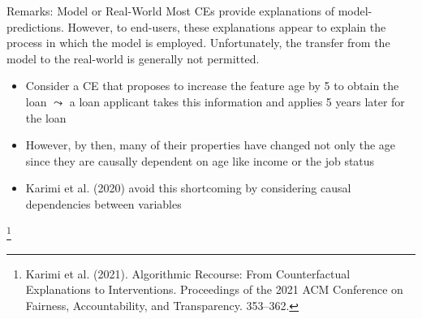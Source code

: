 \documentclass[11pt,compress,t,notes=noshow, aspectratio=169, xcolor=table]{beamer}
\begin{document}
\begin{frame}{Remarks: Model or Real-World}
Most CEs provide explanations of model-predictions. However, to end-users, these explanations appear to explain the process in which the model is employed. Unfortunately, the transfer from the model to the real-world is generally not permitted.
	\begin{itemize}
	\item Consider a CE that proposes to increase the feature age by 5 to obtain the loan $\leadsto$ a loan applicant takes this information and applies 5 years later for the loan
	\item However, by then, many of their properties have changed not only the age since they are causally dependent on age like income or the job status
	\item Karimi et al. (2020) avoid this shortcoming by considering causal dependencies between variables
	\end{itemize}
\footnote[frame]{Karimi et al. (2021). Algorithmic Recourse: From Counterfactual Explanations to Interventions.  Proceedings of the 2021 ACM Conference on Fairness, Accountability, and Transparency. 353–362.}
\end{frame}


\endlecture
\end{document}

